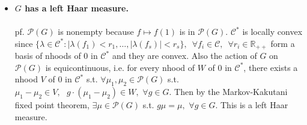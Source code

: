 \documentclass[12pt,letterpaper]{report}
\begin{document}
\begin{itemize}
\item \textbf{$G$ has a left Haar measure.}
\\\\pf. $\mathcal{P}(G)$ is nonempty because $f\mapsto f(1)$ is in $\mathcal{P}(G)$. $\mathcal{C}^{*}$ is locally convex since $\{\lambda\in\mathcal{C}^{*} :|\lambda(f_{1})<r_{1},\dots,|\lambda(f_{s})|<r_{s}\},\,\,\,\forall f_{i}\in\mathcal{C},\,\,\,\forall r_{i}\in\mathbb{R}_{++}$ form a basis of nhoods of 0 in $\mathcal{C}^{*}$ and they are convex. Also the action of $G$ on $\mathcal{P}(G)$ is equicontinuous, i.e. for every nhood of $W$ of 0 in $\mathcal{C}^{*}$, there exists a nhood $V$ of 0 in $\mathcal{C}^{*}$ s.t. $\forall \mu_{1},\mu_{2}\in\mathcal{P}(G)$ s.t. $\mu_{1}-\mu_{2}\in V,\,\,\,\,g\cdot(\mu_{1}-\mu_{2})\in W,\,\,\forall g\in G$. Then by the Markov-Kakutani fixed point theorem, $\exists \mu\in\mathcal{P}(G)$ s.t. $g\mu=\mu,\,\,\forall g\in G$. This is a left Haar measure. 

\end{itemize}
\end{document}
